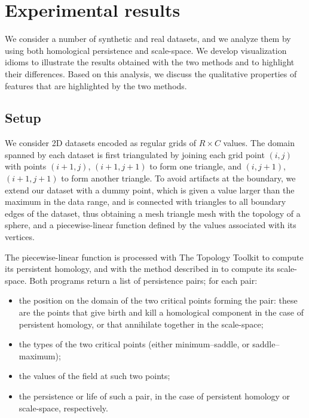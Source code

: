 

\section{Experimental results}
\label{sec:results}

We consider a number of synthetic and real datasets, and we analyze them by using both homological persistence and scale-space.
We develop visualization idioms to illustrate the results obtained with the two methods and to highlight their differences.
Based on this analysis, we discuss the qualitative properties of features that are highlighted by the two methods. 

\subsection{Setup}
\label{sub:setup}

We consider 2D datasets encoded as regular grids of $R\times C$ values. 
The domain spanned by each dataset is first triangulated by joining each grid point $(i,j)$ with points $(i+1,j)$, $(i+1,j+1)$ to form one triangle, and $(i,j+1)$, $(i+1,j+1)$ to form another triangle. 
To avoid artifacts at the boundary, we extend our dataset with a dummy point, which is given a value larger than the maximum in the data range, and is connected with triangles to all boundary edges of the dataset, thus obtaining a mesh triangle mesh with the topology of a sphere, and a piecewise-linear function defined by the values associated with its vertices. 

The piecewise-linear function is processed with The Topology Toolkit \cite{ttk} to compute its persistent homology, and with the method described in \cite{Rocca:2013} to compute its scale-space. 
Both programs return a list of persistence pairs; for each pair:
\begin{itemize}
\item the position on the domain of the two critical points forming the pair: these are the points that give birth and kill a homological component in the case of persistent homology, or that annihilate together in the scale-space;
\item the types of the two critical points (either minimum--saddle, or saddle--maximum);
\item the values of the field at such two points;
\item the persistence or life of such a pair, in the case of persistent homology or scale-space, respectively. 
\end{itemize}

